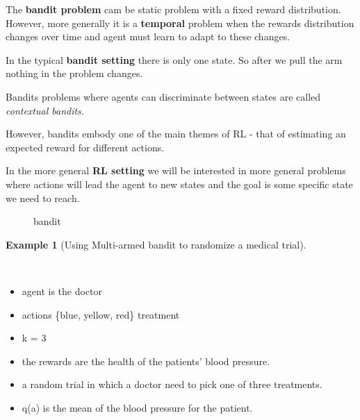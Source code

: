 \documentclass[
  letterpaper,
  DIV=11,
  numbers=noendperiod,
  oneside]{scrartcl}
\makeatletter
\providecommand{\tightlist}{%
  \setlength{\itemsep}{0pt}\setlength{\parskip}{0pt}}\usepackage{longtable,booktabs,array}
\newcommand*\pandocbounded[1]{%
  \sbox\pandoc@box{#1}%
  \Gscale@div\@tempa{\textheight}{\dimexpr\ht\pandoc@box+\dp\pandoc@box\relax}%
  \Gscale@div\@tempb{\linewidth}{\wd\pandoc@box}%
  \ifdim\@tempb\p@<\@tempa\p@\let\@tempa\@tempb\fi%
  \ifdim\@tempa\p@<\p@\scalebox{\@tempa}{\usebox\pandoc@box}%
  \else\usebox{\pandoc@box}%
  \fi%
}
\theoremstyle{definition}
\newtheorem{example}{Example}[section]
\theoremstyle{remark}
\makeatother
\begin{document}
The \textbf{bandit problem} cam be static problem with a fixed reward
distribution. However, more generally it is a \textbf{temporal} problem
when the rewards distribution changes over time and agent must learn to
adapt to these changes.

\begin{tcolorbox}[enhanced jigsaw, left=2mm, leftrule=.75mm, bottomtitle=1mm, toptitle=1mm, title=\textcolor{quarto-callout-note-color}{\faInfo}\hspace{0.5em}{Difference between bandits and RL}, breakable, toprule=.15mm, colbacktitle=quarto-callout-note-color!10!white, coltitle=black, colback=white, opacityback=0, rightrule=.15mm, bottomrule=.15mm, colframe=quarto-callout-note-color-frame, titlerule=0mm, opacitybacktitle=0.6, arc=.35mm]

In the typical \textbf{bandit setting} there is only one state. So after
we pull the arm nothing in the problem changes.

Bandits problems where agents can discriminate between states are called
\emph{contextual bandits.}

However, bandits embody one of the main themes of RL - that of
estimating an expected reward for different actions.

In the more general \textbf{RL setting} we will be interested in more
general problems where actions will lead the agent to new states and the
goal is some specific state we need to reach.

\end{tcolorbox}

\begin{figure}[H]

{\centering \pandocbounded{\texttt{[image: img/multi\_armed\_bandit.webm]}}

}

\caption{bandit}

\end{figure}%

\begin{example}[Using Multi-armed bandit to randomize a medical
trial]\protect\hypertarget{exm-clinical-trials}{}\label{exm-clinical-trials}

~

\begin{itemize}
\tightlist
\item
  agent is the doctor
\item
  actions \{blue, yellow, red\} treatment
\item
  k = 3
\item
  the rewards are the health of the patients' blood pressure.
\item
  a random trial in which a doctor need to pick one of three treatments.
\item
  q(a) is the mean of the blood pressure for the patient.
\end{itemize}

\end{example}
\end{document}
